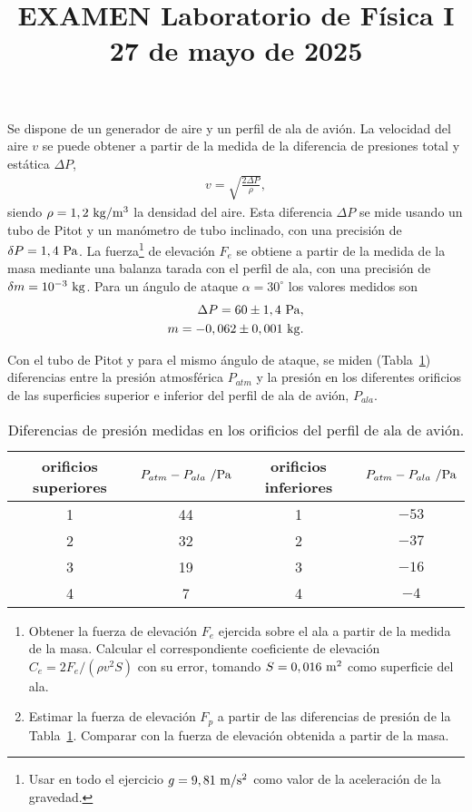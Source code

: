 \documentclass[12pt]{articulo}
\date{\vspace{-5ex}}
\begin{document}
\title{\bf EXAMEN Laboratorio de F\'isica I\\27 de mayo de 2025} 

\author{}

\maketitle

Se dispone de un generador de aire y un perfil de ala de avi\'on. La velocidad
del aire $v$ se puede obtener a partir de la medida de la diferencia de
presiones total y est\'atica $\Delta P$,
%
\begin{eqnarray*}
v = \sqrt{\frac{2\Delta P}{\rho}},
\end{eqnarray*}
%
siendo $\rho = 1,2~{\rm kg/m^3}$ la densidad del aire. Esta diferencia $\Delta P$
se mide usando un tubo de Pitot y un man\'ometro de tubo inclinado, con una
precisi\'on de $\delta P = 1,4~{\rm Pa}$. La fuerza\footnote{Usar en todo el
ejercicio $g = 9,81~{\rm m/s^2}$ como valor de la aceleraci\'on de la gravedad.}
de elevaci\'on $F_e$ se obtiene a partir de la medida de la masa mediante una balanza
tarada con el perfil de ala, con una precisi\'on de $\delta m = 10^{-3}~{\rm kg}$.
Para un \'angulo de ataque $\alpha = 30^{\circ}$ los valores medidos son
%
\begin{eqnarray*}
\Delta P = 60 \pm 1,4~{\rm Pa},\\
m = -0,062 \pm 0,001~{\rm kg}.
\end{eqnarray*}

Con el tubo de Pitot y para el mismo \'angulo de ataque, se miden
(Tabla~\ref{tab:presiones}) diferencias entre la presi\'on atmosf\'erica
$P_{atm}$ y la presi\'on en los diferentes orificios de las superficies superior
e inferior del perfil de ala de avi\'on, $P_{ala}$.
\begin{table}[h!]
\begin{center}
\begin{tabular}{cc|cc}
\hline
orificios superiores & $P_{atm} - P_{ala}~/{\rm Pa}$ & orificios inferiores & $P_{atm} - P_{ala}~/{\rm Pa}$\\
\hline
1 & 44 & 1 & $-53$\\
2 & 32 & 2 & $-37$\\
3 & 19 & 3 & $-16$\\
4 &  7 & 4 &  $-4$\\
\hline
\end{tabular}
\end{center}
\caption{Diferencias de presi\'on medidas en los orificios del perfil de ala de avi\'on.}
\label{tab:presiones}
\end{table}

\begin{enumerate}
\item{Obtener la fuerza de elevaci\'on $F_e$ ejercida sobre el ala a partir de la
  medida de la masa. Calcular el correspondiente coeficiente de elevaci\'on
  $C_e = 2F_e / (\rho v^2 S)$ con su error, tomando $S = 0,016~{\rm m^2}$ como
  superficie del ala.}
\item{Estimar la fuerza de elevaci\'on $F_p$ a partir de las diferencias de
  presi\'on de la Tabla~\ref{tab:presiones}. Comparar con la fuerza de
  elevaci\'on obtenida a partir de la masa.}
\end{enumerate}
\end{document}
